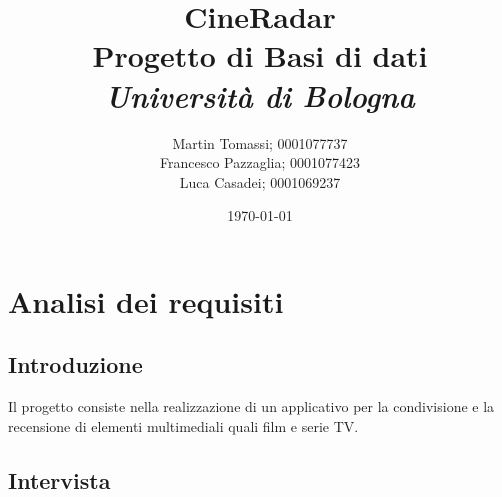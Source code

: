 \documentclass[a4paper,12pt]{report}
\title{\textbf{CineRadar}\\Progetto di Basi di dati\\\textit{Università di Bologna}}
\author{Martin Tomassi; 0001077737\\Francesco Pazzaglia; 0001077423\\Luca Casadei; 0001069237}
\date{\today}
\begin{document}
	\maketitle
	\tableofcontents
	\chapter{Analisi dei requisiti}
	\section{Introduzione}
	Il progetto consiste nella realizzazione di un applicativo per la condivisione e la recensione di elementi multimediali quali film e serie TV.
	\section{Intervista}
\end{document}
